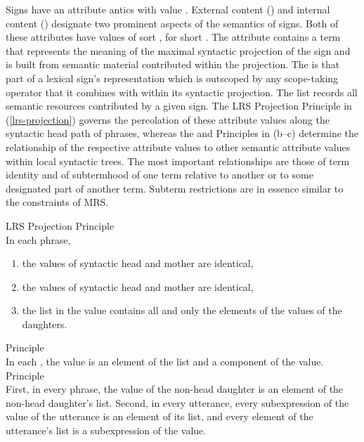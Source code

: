 \documentclass[output=paper,biblatex,babelshorthands,newtxmath,draftmode,colorlinks,citecolor=brown]{langscibook}
\begin{document}
Signs have an attribute antics with value
. External content () and internal content
() designate two prominent aspects of the semantics of
signs. Both of these attributes have
values of sort , for short
. The attribute  contains a term
that represents the meaning of the maximal syntactic projection of the sign
and is built from semantic material contributed within the projection. The
 is that part of a lexical sign's representation which is
outscoped by any scope-taking operator that it combines with within
its syntactic projection. The  list records all semantic
resources contributed by a given sign. The LRS Projection Principle in (\ref{lrs-projection})
governs the percolation of these attribute values along the syntactic
head path of phrases, whereas the  and 
Principles in (b--c) determine the relationship of the respective attribute
values to other semantic attribute values within local syntactic
trees. The most important relationships are those of term identity and
of subtermhood of one term relative to another or to some designated part
of another term. Subterm restrictions are in essence similar
to the  constraints of MRS.

\begin{exe}
  \ex\label{lrs-essent-principles}
  \begin{xlist}
    \ex\label{lrs-projection} LRS Projection Principle\\
    In each phrase,
    \begin{enumerate}
    \item the  values of syntactic head and mother are identical,
    \item the  values of syntactic head and mother are identical,
    \item the list in the  value contains all and only the elements
    of the  values of the daughters.
    \end{enumerate}
    \ex\label{lrs-incont}  Principle\\
    In each , the  value is an element of the
     list and a component of the  value.
    \ex\label{lrs-excont}  Principle\\
    First, in every phrase, the  value of the non-head daughter
    is an element of the non-head daughter's  list. Second, in
    every utterance, every subexpression of the  value of the
    utterance is an element of its  list, and every element of
    the utterance's  list is a subexpression of the 
    value.
  \end{xlist}
\end{exe}
\end{document}

